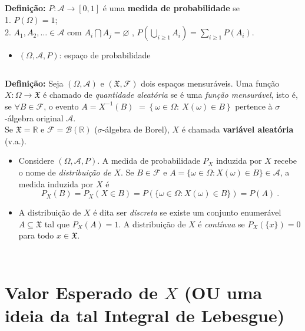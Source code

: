 \documentclass[
]{book}
\providecommand{\tightlist}{%
  \setlength{\itemsep}{0pt}\setlength{\parskip}{0pt}}
\begin{document}
\(~\)

\textbf{Definição:} \(P: \mathcal{A} \longrightarrow [0,1]\) é uma \textbf{medida de probabilidade} se\\
1. \(P(\Omega) = 1\);\\
2. \(\displaystyle A_1, A_2, \ldots \in \mathcal{A}\) com \(A_i \bigcap A_j = \varnothing\) , \(\displaystyle P\left(\bigcup_{i \geq 1} A_i\right) = \sum_{i \geq 1} P\left(A_i\right)\).

\begin{itemize}
\tightlist
\item
  \((\Omega, \mathcal{A}, P)\): espaço de probabilidade
\end{itemize}

\(~\)

\textbf{Definição:} Seja \((\Omega,\mathcal{A})\) e \((\mathfrak{X},\mathcal{F})\) dois espaços mensuráveis. Uma função \(X: \Omega \longrightarrow \mathfrak{X}\) é chamado de \emph{quantidade aleatória} se é uma \emph{função mensurável}, isto é, se \(\forall B \in \mathcal{F}\), o evento \(A = X^{-1}(B)\) \(= \left\{\omega \in \Omega:~X(\omega)\in B\right\}\) pertence à \(\sigma\)-álgebra original \(\mathcal{A}\).\\
Se \(\mathfrak{X} = \mathbb{R}\) e \(\mathcal{F}=\mathcal{B}(\mathbb{R})\) (\(\sigma\)-álgebra de Borel), \(X\) é chamada \textbf{variável aleatória} (v.a.).

\begin{itemize}
\item
  Considere \((\Omega,\mathcal{A},P)\). A medida de probabilidade \(P_X\) induzida por \(X\) recebe o nome de \emph{distribuição de \(X\)}. Se \(B \in \mathcal{F}\) e \(A = \{\omega \in \Omega : X(\omega) \in B\} \in \mathcal{A}\), a medida induzida por \(X\) é
  \[P_X(B) = P_X\left(X \in B\right) = P\left(\{\omega \in \Omega :  X(\omega) \in B\}\right) = P(A)~.\]
\item
  A distribuição de \(X\) é dita ser \emph{discreta} se existe um conjunto enumerável \(A \subseteq \mathfrak{X}\) tal que \(P_X(A)=1\). A distribuição de \(X\) é \emph{contínua} se \(P_X\left(\{x\}\right)=0\) para todo \(x \in \mathfrak{X}\).
\end{itemize}

\(~\)

\(~\)

\hypertarget{lebesgue}{%
\section{\texorpdfstring{Valor Esperado de \(X\) (OU uma ideia da tal Integral de Lebesgue)}{Valor Esperado de X (OU uma ideia da tal Integral de Lebesgue)}}\label{lebesgue}}
\end{document}
